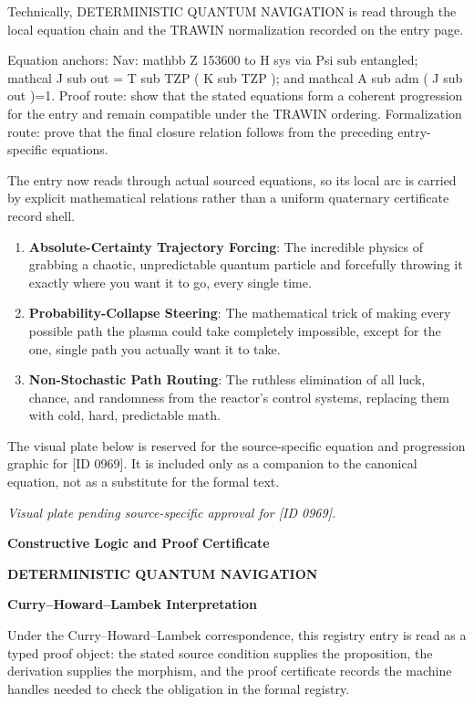 Technically, DETERMINISTIC QUANTUM NAVIGATION is read through the local equation chain and the TRAWIN normalization recorded on the entry page.

Equation anchors: Nav: mathbb Z 153600 to H sys via Psi sub entangled; mathcal J sub out = T sub TZP ( K sub TZP ); and mathcal A sub adm ( J sub out )=1. Proof route: show that the stated equations form a coherent progression for the entry and remain compatible under the TRAWIN ordering. Formalization route: prove that the final closure relation follows from the preceding entry-specific equations.

The entry now reads through actual sourced equations, so its local arc is carried by explicit mathematical relations rather than a uniform quaternary certificate record shell.
\endgroup

\begin{enumerate}[leftmargin=1.6em,itemsep=6pt,topsep=4pt]
\item \textbf{Absolute-Certainty Trajectory Forcing}: The incredible physics of grabbing a chaotic, unpredictable quantum particle and forcefully throwing it exactly where you want it to go, every single time.
\item \textbf{Probability-Collapse Steering}: The mathematical trick of making every possible path the plasma could take completely impossible, except for the one, single path you actually want it to take.
\item \textbf{Non-Stochastic Path Routing}: The ruthless elimination of all luck, chance, and randomness from the reactor's control systems, replacing them with cold, hard, predictable math.
\end{enumerate}

\begingroup\footnotesize\sloppy
The visual plate below is reserved for the source-specific equation and progression graphic for [ID 0969]. It is included only as a companion to the canonical equation, not as a substitute for the formal text.
\par\endgroup
\begingroup\footnotesize\itshape
Visual plate pending source-specific approval for [ID 0969].
\par\endgroup

\clearpage
\begingroup\tzpsupportsetup
\noindent\textbf{\fontsize{10.8pt}{12.8pt}\selectfont [ID 0969] Constructive Logic and Proof Certificate}\par
\noindent\textbf{\fontsize{10pt}{12pt}\selectfont DETERMINISTIC QUANTUM NAVIGATION}\par
\vspace{0.45em}
\begingroup
\footnotesize
\setlength{\parskip}{0.22em}
\setlength{\parindent}{0pt}
\noindent\textbf{Curry--Howard--Lambek Interpretation}\par
Under the Curry--Howard--Lambek correspondence, this registry entry is read as a typed proof
object: the stated source condition supplies the proposition, the derivation supplies the
morphism, and the proof certificate records the machine handles needed to check the obligation
in the formal registry.

